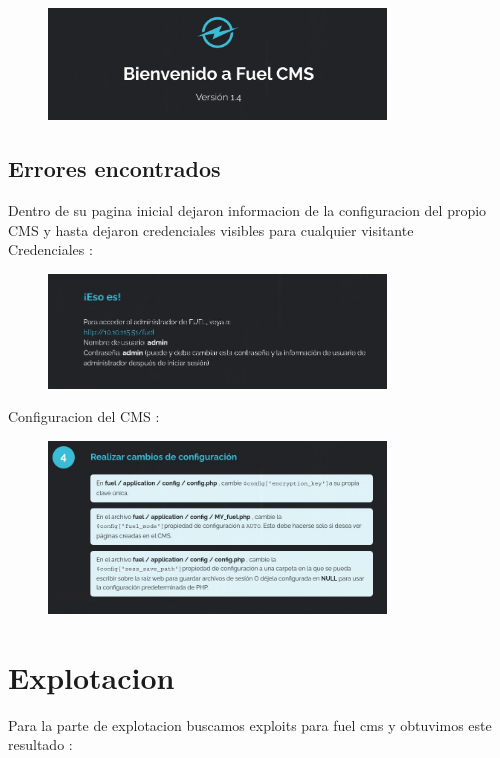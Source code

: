 \documentclass[a4paper]{article}%
\begin{document}
	\begin{figure}[h]
   \includegraphics[width=0.8\textwidth]{images/fuelcms.jpg}
   \end{figure}	
	
	\subsection{Errores encontrados}
	Dentro de su pagina inicial dejaron informacion de la configuracion
	del propio CMS y hasta dejaron credenciales visibles para cualquier
	visitante 
	\\
	Credenciales :
	\begin{figure}[h]
   \includegraphics[width=0.8\textwidth]{images/credenciales.jpg}
   \end{figure}


	\vspace{0.2cm}
	\newpage
	Configuracion del CMS :

	\begin{figure}[h]
   \includegraphics[width=0.8\textwidth]{images/confcms.jpg}
   \end{figure}

	\section{Explotacion}
	Para la parte de explotacion buscamos exploits para fuel cms y
	obtuvimos este resultado :
\end{document}
